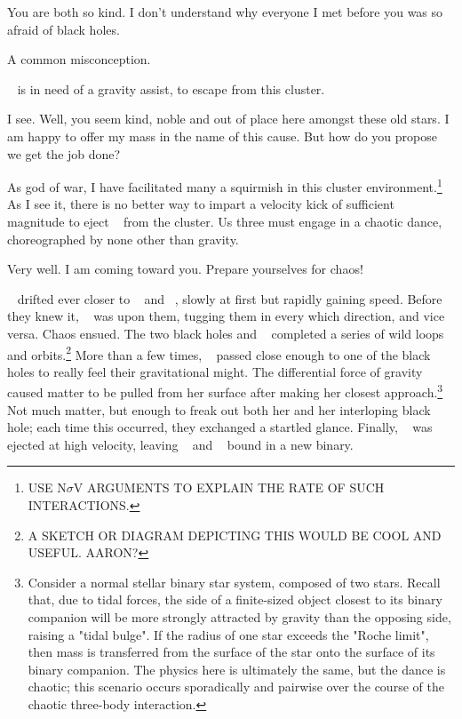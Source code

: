 \documentclass[main.tex]{subfiles}
\begin{document}
\par \Sterope You are both so kind.  I don't understand why everyone I met before you was so afraid of black holes.

\par \Zeus A common misconception. 

\par \Ares \rmsterope~ is in need of a gravity assist, to escape from this cluster.

\par \Zeus I see.  Well, you seem kind, noble and out of place here amongst these old stars.  I am happy to offer my mass in the name of this cause.  But how do you propose we get the job done?

\par \Ares As god of war, I have facilitated many a squirmish in this cluster environment.\footnote{USE N$\sigma$V ARGUMENTS TO EXPLAIN THE RATE OF SUCH INTERACTIONS.}  As I see it, there is no better way to impart a velocity kick of sufficient magnitude to eject \rmsterope~ from the cluster.  Us three must engage in a chaotic dance, choreographed by none other than gravity.

\par \Zeus  Very well.  I am coming toward you.  Prepare yourselves for chaos!

\par \nar \rmzeus~ drifted ever closer to \rmsterope~ and \rmares~, slowly at first but rapidly gaining speed.  Before they knew it, \rmzeus~ was upon them, tugging them in every which direction, and vice versa.  Chaos ensued.  The two black holes and \rmmerope~ completed a series of wild loops and orbits.\footnote{A SKETCH OR DIAGRAM DEPICTING THIS WOULD BE COOL AND USEFUL.  AARON?}  More than a few times, \rmmerope~ passed close enough to one of the black holes to really feel their gravitational might.  The differential force of gravity caused matter to be pulled from her surface after making her closest approach.\footnote{Consider a normal stellar binary star system, composed of two stars.  Recall that, due to tidal forces, the side of a finite-sized object closest to its binary companion will be more strongly attracted by gravity than the opposing side, raising a "tidal bulge".  If the radius of one star exceeds the "Roche limit", then mass is transferred from the surface of the star onto the surface of its binary companion.  The physics here is ultimately the same, but the dance is chaotic; this scenario occurs sporadically and pairwise over the course of the chaotic three-body interaction.} Not much matter, but enough to freak out both her and her interloping black hole; each time this occurred, they exchanged a startled glance.  Finally, \rmmerope~ was ejected at high velocity, leaving \rmares~ and \rmzeus~ bound in a new binary.    
\end{document}
